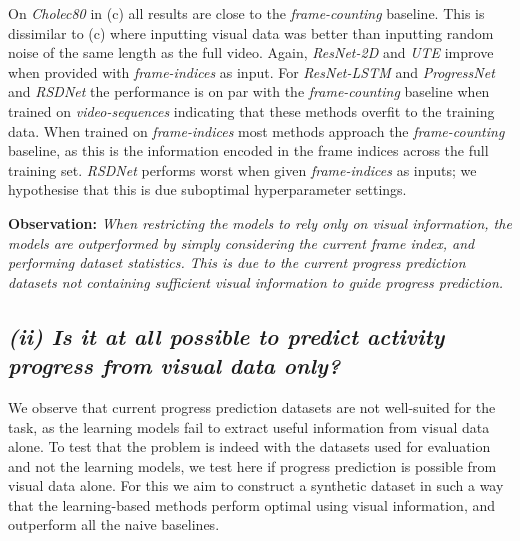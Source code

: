 On \textsl{Cholec80} in (c) all results are close to the \textsl{frame-counting} baseline. 
This is dissimilar to (c) where inputting visual data was better than inputting random noise of the same length as the full video.
Again, \textsl{ResNet-2D} and \textsl{UTE} improve when provided with \textsl{frame-indices} as input. 
For \textsl{ResNet-LSTM} and \textsl{ProgressNet} and \textsl{RSDNet} the performance is on par with the \textsl{frame-counting} baseline when trained on \textsl{video-sequences} indicating that these methods overfit to the training data.
When trained on \textsl{frame-indices} most methods approach the \textsl{frame-counting} baseline, as this is the information encoded in the frame indices across the full training set.
\textsl{RSDNet} performs worst when given \textsl{frame-indices} as inputs;  we hypothesise that this is due suboptimal hyperparameter settings. 

\smallskip\noindent\textbf{Observation:} 
\emph{
When restricting the models to rely only on visual information, the models are outperformed by simply considering the current frame index, and performing dataset statistics.
This is due to the current progress prediction datasets not containing sufficient visual information to guide progress prediction.}


\subsection{\emph{\textbf{(ii) Is it at all possible to predict activity progress from visual data only?}}}
We observe that current progress prediction datasets are not well-suited for the task, as the learning models fail to extract useful information from visual data alone. 
To test that the problem is indeed with the datasets used for evaluation and not the learning models, we test here if progress prediction is possible from visual data alone.
For this we aim to construct a synthetic dataset in such a way that the learning-based methods perform optimal using visual information, and outperform all the naive baselines.

